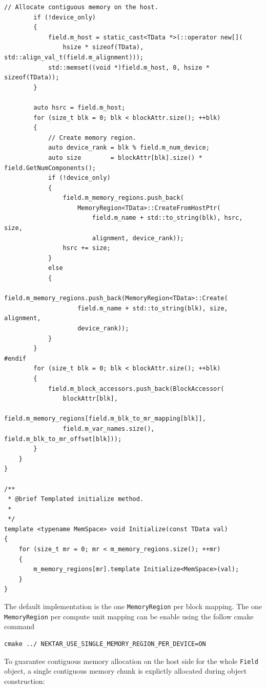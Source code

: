 \begin{lstlisting}[style=C++Style]
        // Allocate contiguous memory on the host.
        if (!device_only)
        {
            field.m_host = static_cast<TData *>(::operator new[](
                hsize * sizeof(TData), std::align_val_t(field.m_alignment)));
            std::memset((void *)field.m_host, 0, hsize * sizeof(TData));
        }

        auto hsrc = field.m_host;
        for (size_t blk = 0; blk < blockAttr.size(); ++blk)
        {
            // Create memory region.
            auto device_rank = blk % field.m_num_device;
            auto size        = blockAttr[blk].size() * field.GetNumComponents();
            if (!device_only)
            {
                field.m_memory_regions.push_back(
                    MemoryRegion<TData>::CreateFromHostPtr(
                        field.m_name + std::to_string(blk), hsrc, size,
                        alignment, device_rank));
                hsrc += size;
            }
            else
            {
                field.m_memory_regions.push_back(MemoryRegion<TData>::Create(
                    field.m_name + std::to_string(blk), size, alignment,
                    device_rank));
            }
        }
#endif
        for (size_t blk = 0; blk < blockAttr.size(); ++blk)
        {
            field.m_block_accessors.push_back(BlockAccessor(
                blockAttr[blk],
                field.m_memory_regions[field.m_blk_to_mr_mapping[blk]],
                field.m_var_names.size(), field.m_blk_to_mr_offset[blk]));
        }
    }
}

/**
 * @brief Templated initialize method.
 *
 */
template <typename MemSpace> void Initialize(const TData val)
{
    for (size_t mr = 0; mr < m_memory_regions.size(); ++mr)
    {
        m_memory_regions[mr].template Initialize<MemSpace>(val);
    }
}
\end{lstlisting}

The default implementation is the one
\lstinline[style=C++Style]!MemoryRegion!  per block mapping. The one
\lstinline[style=C++Style]!MemoryRegion! per compute unit mapping can
be enable using the follow cmake command
\begin{lstlisting}[style=BashInputStyle]
cmake ../ NEKTAR_USE_SINGLE_MEMORY_REGION_PER_DEVICE=ON
\end{lstlisting}

To guarantee contiguous memory allocation on the host side for the whole \lstinline[style=C++Style]!Field! object, a single contiguous memory chunk is explictly allocated during object construction:

